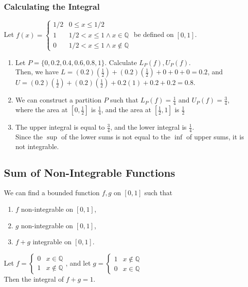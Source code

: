 \documentclass{article}
\begin{document}
\subsubsection{Calculating the Integral}
Let $f(x) = \begin{cases}
1/2 & 0 \leq x \leq 1/2\\
1 & 1/2 < x \leq 1 \land x \in \mathbb{Q}\\
0 & 1/2 < x \leq 1 \land x \not\in \mathbb{Q}
\end{cases}$
be defined on $[0,1]$.
\begin{enumerate}
    \item Let $P = \{0,0.2, 0.4,0.6,0.8,1\}$. Calculate $L_P(f), U_P(f)$.\\
    Then, we have $L = (0.2)(\frac{1}{2}) + (0.2)(\frac{1}{2}) + 0 + 0 + 0 = 0.2$, and\\
    $U = (0.2)(\frac{1}{2}) + (0.2)(\frac{1}{2}) + 0.2(1) + 0.2 + 0.2 = 0.8$.
    
    \item We can construct a partition $P$ such that $L_P(f) = \frac{1}{4}$ and $U_P(f) = \frac{3}{4}$, where the area at $[0, \frac{1}{2}]$ is $\frac{1}{4}$, and the area at $[\frac{1}{2}, 1]$ is $\frac{1}{2}$
    
    \item The upper integral is equal to $\frac{3}{4}$, and the lower integral is $\frac{1}{4}$.\\
    Since the $\sup$ of the lower sums is not equal to the $\inf$ of upper sums, it is not integrable.
\end{enumerate}

\subsection{Sum of Non-Integrable Functions}
We can find a bounded function $f, g$ on $[0,1]$ such that
\begin{enumerate}
    \item $f$ non-integrable on $[0,1]$,
    \item $g$ non-integrable on $[0,1]$,
    \item $f + g$ integrable on $[0,1]$.
\end{enumerate}
Let $f = \begin{cases}
0 & x \in \mathbb{Q}\\
1 & x \not\in \mathbb{Q}
\end{cases}$,
and let $g = \begin{cases}
1 & x \not\in \mathbb{Q}\\
0 & x \in \mathbb{Q}
\end{cases}$\\
Then the integral of $f + g = 1$.
\end{document}
